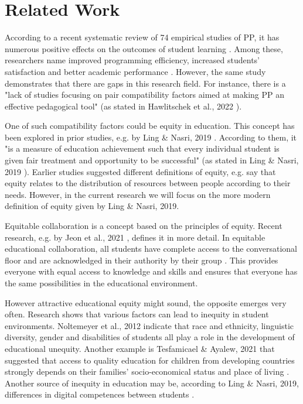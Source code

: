\documentclass[conference]{IEEEtran}
\begin{document}
\section{Related Work}
According to a recent systematic review of 74 empirical studies of PP, it has numerous positive effects on the outcomes of student learning \cite{HawlBern}. Among these, researchers name improved programming efficiency, increased students' satisfaction and better academic performance \cite{HawlBern}. However, the same study demonstrates that there are gaps in this research field. For instance, there is a "lack of studies focusing on pair compatibility factors aimed at making PP an effective pedagogical tool" (as stated in Hawlitschek et al., 2022 \cite{HawlBern}).

One of such compatibility factors could be equity in education. This concept has been explored in prior studies, e.g. by Ling \& Nasri, 2019 \cite{LingNasr}. According to them, it "is a measure of education achievement such that every individual student is given fair treatment and opportunity to be successful" (as stated in Ling \& Nasri, 2019 \cite{LingNasr}). Earlier studies suggested different definitions of equity, e.g. \cite{ParsTurn} say that equity relates to the distribution of resources between people according to their needs. However, in the current research we will focus on the more modern definition of equity given by Ling \& Nasri, 2019.

Equitable collaboration is a concept based on the principles of equity. Recent research, e.g. by Jeon et al., 2021 \cite{JeonHolm}, defines it in more detail. In equitable educational collaboration, all students have complete access to the conversational floor and are acknowledged in their authority by their group \cite{JeonHolm}. This provides everyone with equal access to knowledge and skills and ensures that everyone has the same possibilities in the educational environment. 

However attractive educational equity might sound, the opposite emerges very often. Research shows that various factors can lead to inequity in student environments. Noltemeyer et al., 2012 \cite{NoltMuji} indicate that race and ethnicity, linguistic diversity, gender and disabilities of students all play a role in the development of educational unequity. Another example is Tesfamicael \& Ayalew, 2021 that suggested that access to quality education for children from developing countries strongly depends on their families' socio-economical status and place of living \cite{TesfAyal}. Another source of inequity in education may be, according to Ling \& Nasri, 2019, differences in digital competences between students \cite{LingNasr}.
\end{document}
